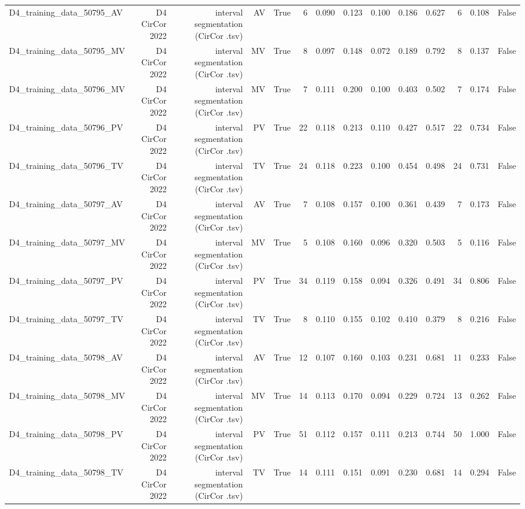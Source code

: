 \begin{table}[htbp]
\begin{tabular}{lrrrrrrrrrrrrr}
    D4\_training\_data\_50795\_AV & D4 CirCor 2022 & interval segmentation (CirCor .tsv) & AV & True & 6 & 0.090 & 0.123 & 0.100 & 0.186 & 0.627 & 6 & 0.108 & False \\
    D4\_training\_data\_50795\_MV & D4 CirCor 2022 & interval segmentation (CirCor .tsv) & MV & True & 8 & 0.097 & 0.148 & 0.072 & 0.189 & 0.792 & 8 & 0.137 & False \\
    D4\_training\_data\_50796\_MV & D4 CirCor 2022 & interval segmentation (CirCor .tsv) & MV & True & 7 & 0.111 & 0.200 & 0.100 & 0.403 & 0.502 & 7 & 0.174 & False \\
    D4\_training\_data\_50796\_PV & D4 CirCor 2022 & interval segmentation (CirCor .tsv) & PV & True & 22 & 0.118 & 0.213 & 0.110 & 0.427 & 0.517 & 22 & 0.734 & False \\
    D4\_training\_data\_50796\_TV & D4 CirCor 2022 & interval segmentation (CirCor .tsv) & TV & True & 24 & 0.118 & 0.223 & 0.100 & 0.454 & 0.498 & 24 & 0.731 & False \\
    D4\_training\_data\_50797\_AV & D4 CirCor 2022 & interval segmentation (CirCor .tsv) & AV & True & 7 & 0.108 & 0.157 & 0.100 & 0.361 & 0.439 & 7 & 0.173 & False \\
    D4\_training\_data\_50797\_MV & D4 CirCor 2022 & interval segmentation (CirCor .tsv) & MV & True & 5 & 0.108 & 0.160 & 0.096 & 0.320 & 0.503 & 5 & 0.116 & False \\
    D4\_training\_data\_50797\_PV & D4 CirCor 2022 & interval segmentation (CirCor .tsv) & PV & True & 34 & 0.119 & 0.158 & 0.094 & 0.326 & 0.491 & 34 & 0.806 & False \\
    D4\_training\_data\_50797\_TV & D4 CirCor 2022 & interval segmentation (CirCor .tsv) & TV & True & 8 & 0.110 & 0.155 & 0.102 & 0.410 & 0.379 & 8 & 0.216 & False \\
    D4\_training\_data\_50798\_AV & D4 CirCor 2022 & interval segmentation (CirCor .tsv) & AV & True & 12 & 0.107 & 0.160 & 0.103 & 0.231 & 0.681 & 11 & 0.233 & False \\
    D4\_training\_data\_50798\_MV & D4 CirCor 2022 & interval segmentation (CirCor .tsv) & MV & True & 14 & 0.113 & 0.170 & 0.094 & 0.229 & 0.724 & 13 & 0.262 & False \\
    D4\_training\_data\_50798\_PV & D4 CirCor 2022 & interval segmentation (CirCor .tsv) & PV & True & 51 & 0.112 & 0.157 & 0.111 & 0.213 & 0.744 & 50 & 1.000 & False \\
    D4\_training\_data\_50798\_TV & D4 CirCor 2022 & interval segmentation (CirCor .tsv) & TV & True & 14 & 0.111 & 0.151 & 0.091 & 0.230 & 0.681 & 14 & 0.294 & False \\

\end{tabular}
\end{table}
